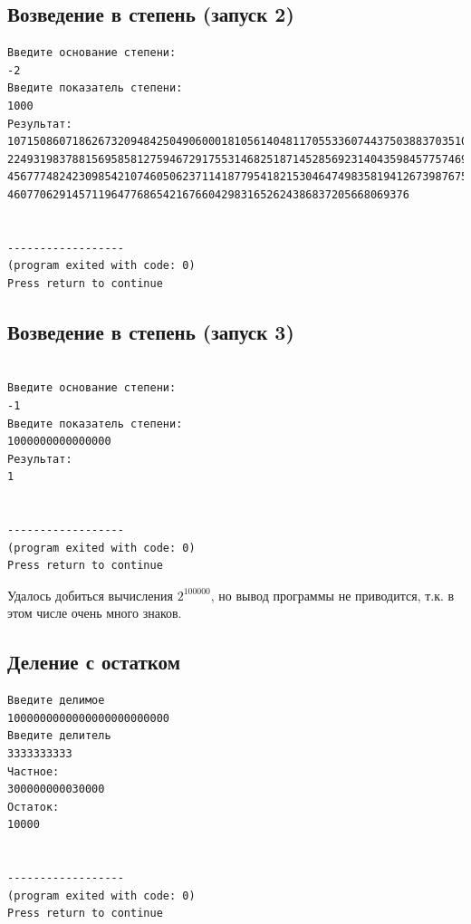 \documentclass[a4paper,12pt]{article} %
\begin{document}
\subsection*{Возведение в степень (запуск 2)}
\begin{verbatim}
Введите основание степени:
-2
Введите показатель степени:
1000
Результат:
10715086071862673209484250490600018105614048117055336074437503883703510511249361
22493198378815695858127594672917553146825187145285692314043598457757469857480393
45677748242309854210746050623711418779541821530464749835819412673987675591655439
46077062914571196477686542167660429831652624386837205668069376


------------------
(program exited with code: 0)
Press return to continue
\end{verbatim}

\subsection*{Возведение в степень (запуск 3)}
\begin{verbatim}

Введите основание степени:
-1
Введите показатель степени:
1000000000000000
Результат:
1


------------------
(program exited with code: 0)
Press return to continue
\end{verbatim}

Удалось добиться вычисления $2^{100000}$,
но вывод программы не приводится, т.к. в этом числе очень много знаков.


\subsection*{Деление с остатком}
\begin{verbatim}
Введите делимое
1000000000000000000000000
Введите делитель
3333333333
Частное:
300000000030000
Остаток:
10000


------------------
(program exited with code: 0)
Press return to continue
\end{verbatim}


\printbibliography
\end{document}
